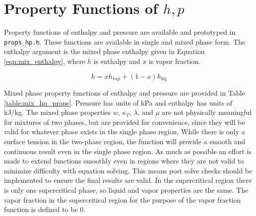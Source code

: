 \documentclass[oneside]{book}
\begin{document}
\section{Property Functions of $h, p$}

Property functions of enthalpy and pressure are available and prototyped in \texttt{props\_hp.h}.  These functions are available in single and mixed phase form.  The enthalpy argument is the mixed phase enthalpy given in Equation \ref{eqn:mix_enthalpy}, where $h$ is enthalpy and $x$ is vapor fraction. 

\begin{equation}\label{eqn:mix_enthalpy}
	h = x h_{\text{vap}} + (1 - x) h_{\text{liq}}
\end{equation}

Mixed phase property functions of enthalpy and pressure are provided in Table \ref{table:mix_hp_props}. Pressure has units of kPa and enthalpy has units of kJ/kg.  The mixed phase properties $w$, $\kappa_T$, $\lambda$, and $\mu$ are not physically meaningful for mixtures of two phases, but are provided for convenience, since they will be valid for whatever phase exists in the single phase region.  While there is only a surface tension in the two-phase region, the function will provide a smooth and continuous result even in the single phase region. As much as possible an effort is made to extend functions smoothly even in regions where they are not valid to minimize difficulty with equation solving.  This means post solve checks should be implemented to ensure the final results are valid.  In the supercritical region there is only one supercritical phase, so liquid and vapor properties are the same.  The vapor fraction in the supercritical region for the purpose of the vapor fraction function is defined to be 0.
\end{document}
